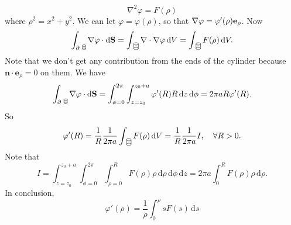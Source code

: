 \begin{example}
\[    \nabla^{2} \varphi=F(\rho)
    \]
    where $\rho^{2}=x^{2}+y^{2}$. We can let $ \varphi=\varphi(\rho) $, so that $ \nabla \varphi=\varphi'(\rho){\bf e}_\rho $. Now 
    \[
        \int_{\partial ~\begin{tikzpicture}[scale=0.35]
            \draw (0,0.1) ellipse (0.2 and 0.1);
            \draw (0,-0.3) ellipse (0.2 and 0.1);
            \draw (-0.2,0.1) -- (-0.2,-0.3);
            \draw (0.2,0.1) -- (0.2,-0.3); 
        \end{tikzpicture}} \nabla \varphi \cdot\mathrm{d}\mathbf{S}=\int_{~\begin{tikzpicture}[scale=0.5]
            \draw (0,0.1) ellipse (0.2 and 0.1);
            \draw (0,-0.3) ellipse (0.2 and 0.1);
            \draw (-0.2,0.1) -- (-0.2,-0.3);
            \draw (0.2,0.1) -- (0.2,-0.3); 
        \end{tikzpicture}} \div \nabla \varphi \,\mathrm{d}V = \int_{~\begin{tikzpicture}[scale=0.5]
            \draw (0,0.1) ellipse (0.2 and 0.1);
            \draw (0,-0.3) ellipse (0.2 and 0.1);
            \draw (-0.2,0.1) -- (-0.2,-0.3);
            \draw (0.2,0.1) -- (0.2,-0.3); 
        \end{tikzpicture}} F(\rho) \,\mathrm{d}V.
    \]
    Note that we don't get any contribution from the ends of the cylinder because $\mathbf{n} \cdot \mathbf{e}_{\rho}=0$ on them. We have 
    \[
        \int_{\partial ~\begin{tikzpicture}[scale=0.35]
            \draw (0,0.1) ellipse (0.2 and 0.1);
            \draw (0,-0.3) ellipse (0.2 and 0.1);
            \draw (-0.2,0.1) -- (-0.2,-0.3);
            \draw (0.2,0.1) -- (0.2,-0.3); 
        \end{tikzpicture}} \nabla \varphi \cdot\mathrm{d}\mathbf{S}=\int_{\phi=0}^{2\pi} \int_{z=z_0}^{z_0+a} \varphi'(R)R \,\mathrm{d}z \,\mathrm{d}\phi = 2\pi a R \varphi'(R).
    \]
    So 
    \[
        \varphi'(R)=\frac{1}{R}\frac{1}{2\pi a}\int_{~\begin{tikzpicture}[scale=0.5]
            \draw (0,0.1) ellipse (0.2 and 0.1);
            \draw (0,-0.3) ellipse (0.2 and 0.1);
            \draw (-0.2,0.1) -- (-0.2,-0.3);
            \draw (0.2,0.1) -- (0.2,-0.3); 
        \end{tikzpicture}} F(\rho) \,\mathrm{d}V=\frac{1}{R}\frac{1}{2\pi a} I,\quad \forall R>0.
    \]
    Note that 
    \[
        I = \int_{z=z_0}^{z_0+a} \int_{\phi=0}^{2\pi} \int_{\rho=0}^{R} F(\rho)\rho \,\mathrm{d}\rho \,\mathrm{d}\phi \,\mathrm{d}z = 2\pi a \int_{0}^{R} F(\rho)\rho \,\mathrm{d}\rho.
    \]
    In conclusion, 
    \[
        \boxed{\varphi'(\rho)=\frac{1}{\rho}\int_{0}^{\rho} sF(s) \,\mathrm{d}s}
    \]
\end{example}

